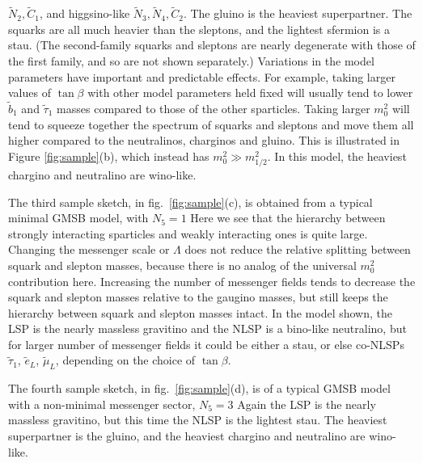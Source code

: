 \documentclass[12pt]{article}
\def\stilde{\widetilde}
\begin{document}
$\stilde N_2, \stilde C_1$, and higgsino-like $\stilde N_3, \stilde N_4,
\stilde C_2$. The gluino is the heaviest superpartner. The squarks are
all much heavier than the sleptons, and the lightest sfermion is a stau.
(The second-family squarks and sleptons are nearly degenerate with those of the first family, and so are not shown separately.) 
Variations in the model 
parameters have important and predictable effects. For example, 
taking larger values of $\tan\beta$ with other model parameters 
held fixed will usually tend to lower $\stilde b_1$ and $\stilde \tau_1$ 
masses compared to those of the other sparticles. 
Taking
larger $m_0^2$ will tend to  
squeeze together the spectrum of squarks and sleptons and move 
them all higher compared to the 
neutralinos, charginos and 
gluino. This is illustrated in Figure \ref{fig:sample}(b), which instead has
$m_0^2 \gg m_{1/2}^2$. 
In this model, the heaviest chargino and neutralino are wino-like.

The third sample sketch, in fig.~\ref{fig:sample}(c), is obtained from a 
typical minimal GMSB model, with $N_5 = 1$ 
Here we see that the hierarchy between 
strongly interacting sparticles and weakly interacting ones is quite 
large. Changing the messenger scale or $\Lambda$ does not reduce the 
relative splitting between squark and slepton masses, because there is no 
analog of the universal $m_0^2$ contribution here. Increasing the number 
of messenger fields tends to decrease the squark and slepton masses 
relative to the gaugino masses, but still keeps the hierarchy between 
squark and slepton masses intact. In the model shown, the LSP is the 
nearly massless gravitino and the NLSP is a 
bino-like neutralino, but for larger number of messenger fields it could 
be either a stau, or else co-NLSPs $\tilde \tau_1$, $\tilde e_L$, $\tilde 
\mu_L$, depending on the choice of $\tan\beta$.

The fourth sample sketch, in fig.~\ref{fig:sample}(d), 
is of a typical GMSB model with a non-minimal messenger sector, $N_5=3$
Again the LSP is the nearly massless gravitino, but this 
time the NLSP is the lightest stau. The heaviest superpartner is the gluino, and the 
heaviest chargino and neutralino
are wino-like.
\end{document}
